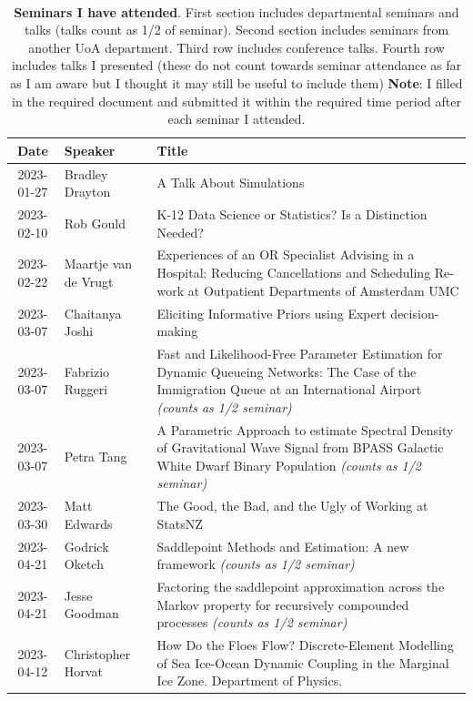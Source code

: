 \documentclass[12pt,a4paper]{article}
\begin{document}
\begin{table}[H]
\caption{
\textbf{Seminars I have attended}.
First section includes departmental seminars and talks (talks count as 1/2 of seminar).
Second section includes seminars from another UoA department.
Third row includes conference talks.
Fourth row includes talks I presented (these do not count towards seminar attendance as far as I am aware but I thought it may still be useful to include them) \newline
\textbf{Note}:
I filled in the required document and submitted it within the required time period after each seminar I attended.
}
\centering
\ ~~~~ \\
\label{tab:seminars}
\begin{tabular}{|c|l|p{10cm}|}
\hline
Date & Speaker & Title \\
\hline
2023-01-27 & Bradley Drayton &
A Talk About Simulations \\
%
2023-02-10 & Rob Gould &
K-12 Data Science or Statistics? Is a Distinction Needed? \\
%
2023-02-22 & Maartje van de Vrugt &
Experiences of an OR Specialist Advising in a Hospital: Reducing Cancellations and
Scheduling Re-work at Outpatient Departments of Amsterdam UMC \\
%
2023-03-07 & Chaitanya Joshi &
Eliciting Informative Priors using Expert decision-making \\
%
2023-03-07 & Fabrizio Ruggeri &
Fast and Likelihood-Free Parameter Estimation for Dynamic Queueing Networks: The
Case of the Immigration Queue at an International Airport \textit{(counts as 1/2 seminar)} \\
%
2023-03-07 & Petra Tang &
A Parametric Approach to estimate Spectral Density of Gravitational Wave Signal from
BPASS Galactic White Dwarf Binary Population \textit{(counts as 1/2 seminar)} \\
%
2023-03-30 & Matt Edwards &
The Good, the Bad, and the Ugly of Working at StatsNZ \\
%
2023-04-21 & Godrick Oketch &
Saddlepoint Methods and Estimation: A new
framework \textit{(counts as 1/2 seminar)} \\
%
2023-04-21 & Jesse Goodman & 
Factoring the saddlepoint approximation across
the Markov property for recursively compounded processes \textit{(counts as 1/2 seminar)} \\

\hline

2023-04-12 & Christopher Horvat &
How Do the Floes Flow? Discrete-Element Modelling of Sea Ice-Ocean Dynamic Coupling in the Marginal Ice Zone. \newline Department of Physics. \\


\end{tabular}
\end{table}
\end{document}
